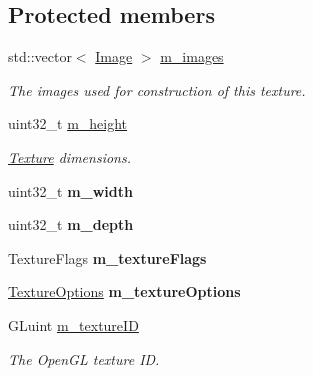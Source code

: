 \subsection*{Protected members}
\begin{DoxyCompactItemize}
\item 
std\+::vector$<$ \mbox{\hyperlink{classrev_1_1_image}{Image}} $>$ \mbox{\hyperlink{classrev_1_1_texture_a34878ce75ef85c0a4dc15a37f0ae6aa7}{m\+\_\+images}}
\begin{DoxyCompactList}\small\item\em The images used for construction of this texture. \end{DoxyCompactList}\item 
\mbox{\label{classrev_1_1_texture_a2df843585d744c8166752532840ca36b}} 
uint32\+\_\+t \mbox{\hyperlink{classrev_1_1_texture_a2df843585d744c8166752532840ca36b}{m\+\_\+height}}
\begin{DoxyCompactList}\small\item\em \mbox{\hyperlink{classrev_1_1_texture}{Texture}} dimensions. \end{DoxyCompactList}\item 
\mbox{\label{classrev_1_1_texture_af57e4087ae4689bbd1b2fce0b65d6786}} 
uint32\+\_\+t {\bfseries m\+\_\+width}
\item 
\mbox{\label{classrev_1_1_texture_a8877d8fab22dcb1cde79974b23facb18}} 
uint32\+\_\+t {\bfseries m\+\_\+depth}
\item 
\mbox{\label{classrev_1_1_texture_a67b182170837fc6a56647da63df2c1fc}} 
Texture\+Flags {\bfseries m\+\_\+texture\+Flags}
\item 
\mbox{\label{classrev_1_1_texture_a7de13d2432943dfc2a1c12112ce0e0d7}} 
\mbox{\hyperlink{structrev_1_1_texture_options}{Texture\+Options}} {\bfseries m\+\_\+texture\+Options}
\item 
G\+Luint \mbox{\hyperlink{classrev_1_1_texture_a7616bcfe5801d73b266f64b05f00d829}{m\+\_\+texture\+ID}}
\begin{DoxyCompactList}\small\item\em The Open\+GL texture ID. \end{DoxyCompactList}\item 
\mbox{\label{classrev_1_1_texture_aa5820d7e53c42ac3d36d8280ac9c6ec4}} 

\end{DoxyCompactItemize}
